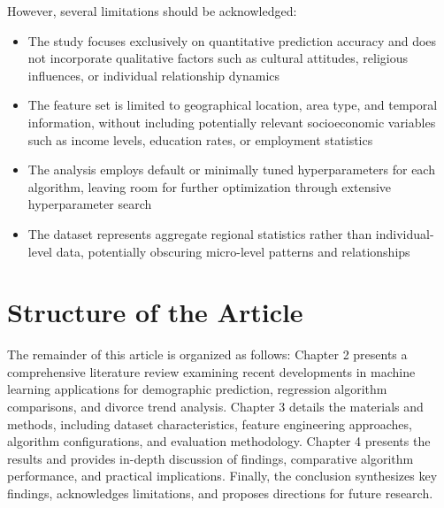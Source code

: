 However, several limitations should be acknowledged:

\begin{itemize}
    \item The study focuses exclusively on quantitative prediction accuracy and does not incorporate qualitative factors such as cultural attitudes, religious influences, or individual relationship dynamics
    \item The feature set is limited to geographical location, area type, and temporal information, without including potentially relevant socioeconomic variables such as income levels, education rates, or employment statistics
    \item The analysis employs default or minimally tuned hyperparameters for each algorithm, leaving room for further optimization through extensive hyperparameter search
    \item The dataset represents aggregate regional statistics rather than individual-level data, potentially obscuring micro-level patterns and relationships
\end{itemize}

\section{Structure of the Article}

The remainder of this article is organized as follows: Chapter 2 presents a comprehensive literature review examining recent developments in machine learning applications for demographic prediction, regression algorithm comparisons, and divorce trend analysis. Chapter 3 details the materials and methods, including dataset characteristics, feature engineering approaches, algorithm configurations, and evaluation methodology. Chapter 4 presents the results and provides in-depth discussion of findings, comparative algorithm performance, and practical implications. Finally, the conclusion synthesizes key findings, acknowledges limitations, and proposes directions for future research.
